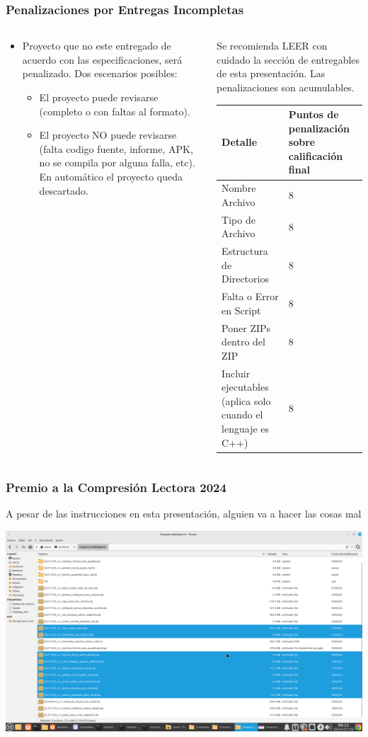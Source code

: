 \begin{frame}
\frametitle{Penalizaciones por Entregas Incompletas}
\begin{columns}
\begin{column}{0.4\textwidth}
\begin{itemize}
\item Proyecto que no este entregado de acuerdo con las especificaciones, ser\'a penalizado. Dos escenarios posibles:
\begin{itemize}
\item El proyecto puede revisarse (completo o con faltas al formato).
\item El proyecto NO puede revisarse (falta codigo fuente, informe, APK, no se compila por alguna falla, etc). En automático el proyecto queda descartado.
\end{itemize}
\end{itemize}
\end{column}
\begin{column}{0.6\textwidth}
Se recomienda LEER con cuidado la secci\'on de entregables de esta presentación. Las penalizaciones son acumulables. 
\small
\begin{tabular}{p{5cm}|p{2cm}}
\hline
\textbf{Detalle} & \textbf{Puntos de penalización sobre calificación final} \\
\hline
Nombre Archivo & 8 \\ \hline
Tipo de Archivo & 8 \\ \hline
Estructura de Directorios  & 8 \\ \hline
Falta o Error en Script  & 8 \\ \hline
Poner ZIPs dentro del ZIP  & 8 \\ \hline
Incluir ejecutables (aplica solo cuando el lenguaje es C++)  & 8 \\
\hline
\hline
\end{tabular}
\end{column}
\end{columns}
\end{frame}




\begin{frame}
\frametitle{Premio a la Compresión Lectora 2024}
A pesar de las instrucciones en esta presentación, alguien va a hacer las cosas mal
\begin{center}
\includegraphics[width=0.75\linewidth]{Entregables/PremioAlaComprensionLectora_2024.png}
\end{center}


\end{frame}


